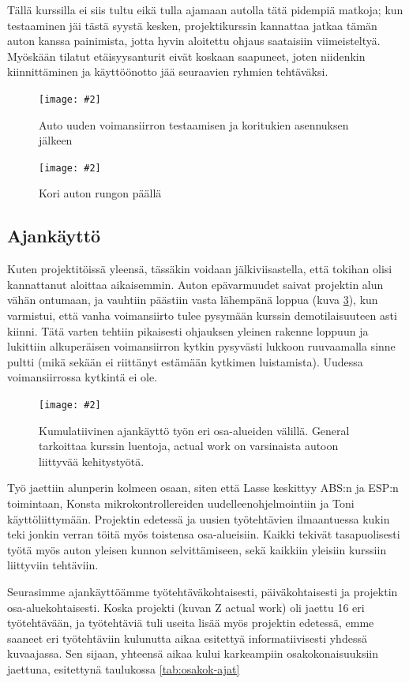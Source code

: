 \documentclass{article}
\newcommand{\kuvaa}[4]{%
	\begin{figure}[h]%
		\centering \texttt{[image: \#2]}%
		\caption{#3 \label{fig:#4}}%
	\end{figure}%
}
\begin{document}
Tällä kurssilla ei siis tultu eikä tulla ajamaan autolla tätä pidempiä matkoja; kun testaaminen jäi tästä syystä kesken, projektikurssin kannattaa jatkaa tämän auton kanssa painimista, jotta hyvin aloitettu ohjaus saataisiin viimeisteltyä. Myöskään tilatut etäisyysanturit eivät koskaan saapuneet, joten niidenkin kiinnittäminen ja käyttöönotto jää seuraavien ryhmien tehtäväksi.

\kuvaa{0.8}{autoauki}{Auto uuden voimansiirron testaamisen ja koritukien asennuksen jälkeen}{autoauki}
\kuvaa{0.8}{autonkori}{Kori auton rungon päällä}{autonkori}

\subsection{Ajankäyttö}

Kuten projektitöissä yleensä, tässäkin voidaan jälkiviisastella, että tokihan olisi kannattanut aloittaa aikaisemmin. Auton epävarmuudet saivat projektin alun vähän ontumaan, ja vauhtiin päästiin vasta lähempänä loppua (kuva \ref{fig:tyojakauma}), kun varmistui, että vanha voimansiirto tulee pysymään kurssin demotilaisuuteen asti kiinni. Tätä varten tehtiin pikaisesti ohjauksen yleinen rakenne loppuun ja lukittiin alkuperäisen voimansiirron kytkin pysyvästi lukkoon ruuvaamalla sinne pultti (mikä sekään ei riittänyt estämään kytkimen luistamista). Uudessa voimansiirrossa kytkintä ei ole.

\kuvaa{0.8}{jakauma}{Kumulatiivinen ajankäyttö työn eri osa-alueiden välillä. General tarkoittaa kurssin luentoja, actual work on varsinaista autoon liittyvää kehitystyötä.}{tyojakauma}

Työ jaettiin alunperin kolmeen osaan, siten että Lasse keskittyy ABS:n ja ESP:n toimintaan, Konsta mikrokontrollereiden uudelleenohjelmointiin ja Toni käyttöliittymään. Projektin edetessä ja uusien työtehtävien ilmaantuessa kukin teki jonkin verran töitä myös toistensa osa-alueisiin. Kaikki tekivät tasapuolisesti työtä myös auton yleisen kunnon selvittämiseen, sekä kaikkiin yleisiin kurssiin liittyviin tehtäviin.

Seurasimme ajankäyttöämme työtehtäväkohtaisesti, päiväkohtaisesti ja projektin osa-aluekohtaisesti. Koska projekti (kuvan Z actual work) oli jaettu 16 eri työtehtävään, ja työtehtäviä tuli useita lisää myös projektin edetessä, emme saaneet eri työtehtäviin kulunutta aikaa esitettyä informatiivisesti yhdessä kuvaajassa. Sen sijaan, yhteensä aikaa kului karkeampiin osakokonaisuuksiin jaettuna, esitettynä taulukossa \ref{tab:osakok-ajat}
\end{document}
